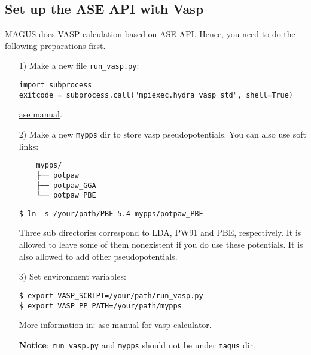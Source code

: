 \documentclass[12pt,oneside]{book}
\newcommand{\file}[1]{\texttt{#1}}
\begin{document}
\subsection{Set up the ASE API with Vasp}
MAGUS does VASP calculation based on ASE API. Hence, you need to do the following preparations first.
\begin{itemize}
\item [1)] 
    Make a new file \file{run\_vasp.py}:
    \begin{tcolorbox}
    \begin{verbatim}
import subprocess
exitcode = subprocess.call("mpiexec.hydra vasp_std", shell=True)
    \end{verbatim}
    \end{tcolorbox}
    \href{https://wiki.fysik.dtu.dk/ase/ase/calculators/vasp.html}{ase manual}.
\item [2)] 
    Make a new \file{mypps} dir to store vasp pseudopotentials. You can also use soft links:
    \begin{verbatim}
    mypps/
    ├── potpaw
    ├── potpaw_GGA
    └── potpaw_PBE
    \end{verbatim}
    \begin{tcolorbox}
        \begin{verbatim}
$ ln -s /your/path/PBE-5.4 mypps/potpaw_PBE
        \end{verbatim}
    \end{tcolorbox}
    Three sub directories correspond to LDA, PW91 and PBE, respectively. It is allowed to leave some of them nonexistent if you do use these potentials. It is also allowed to add other pseudopotentials.
\item [3)] 
    Set environment variables:
    \begin{tcolorbox}
        \begin{verbatim}
$ export VASP_SCRIPT=/your/path/run_vasp.py
$ export VASP_PP_PATH=/your/path/mypps
        \end{verbatim}
    \end{tcolorbox}
    More information in: \textcolor{blue}{\href{https://wiki.fysik.dtu.dk/ase/ase/calculators/vasp.html\#module-ase.calculators.vasp}{ase manual for vasp calculator}}.\par
    \textbf{Notice}: \file{run\_vasp.py} and \file{mypps} should not be under \file{magus} dir.
\end{itemize}
\end{document}
